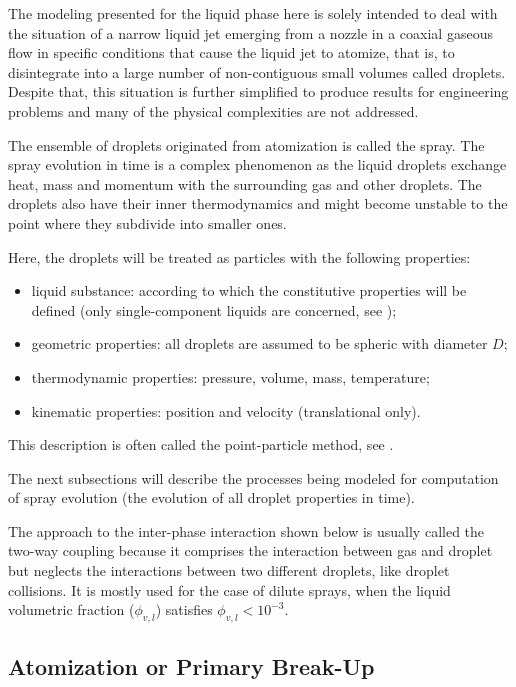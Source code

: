 The modeling presented for the liquid phase here is solely intended to deal with
the situation of a narrow liquid jet emerging from a nozzle in a coaxial gaseous
flow in 
specific conditions that cause the liquid jet to atomize, that is, to
disintegrate into a large number of non-contiguous small volumes called
droplets. 
Despite that, this situation is further simplified to produce results for
engineering problems and many of the physical complexities are not addressed.

The ensemble of droplets originated from atomization is called the spray.
The spray evolution in time is a complex phenomenon as the liquid droplets exchange heat, mass
and momentum with the surrounding gas and other droplets. The droplets
also have their inner thermodynamics and might become unstable to the
point where they subdivide into smaller ones.

Here, the droplets will be treated as particles with the following properties:
\begin{itemize}
 \item liquid substance: according to which the constitutive properties will be
defined (only single-component liquids are concerned, see
\cite{baumgarten2006mixture});
 \item geometric properties: all droplets are assumed to be spheric with 
diameter $D$;
 \item thermodynamic properties: pressure, volume, mass, temperature;
 \item kinematic properties: position and velocity (translational only).
\end{itemize}

This description is often called the point-particle method, see \cite{balachandar2010turbulent}.

The next subsections will describe the processes being modeled for
computation of spray evolution (the evolution of all droplet properties in time). 

The approach to the inter-phase interaction shown below is usually called the two-way coupling because it
comprises the interaction between gas and droplet but neglects the interactions between two different droplets, like
droplet collisions. It is mostly used for the case of dilute sprays, when the liquid volumetric fraction ($\phi_{v,l}$) satisfies $\phi_{v,l}<10^{-3}$.

\subsection{Atomization or Primary Break-Up}

